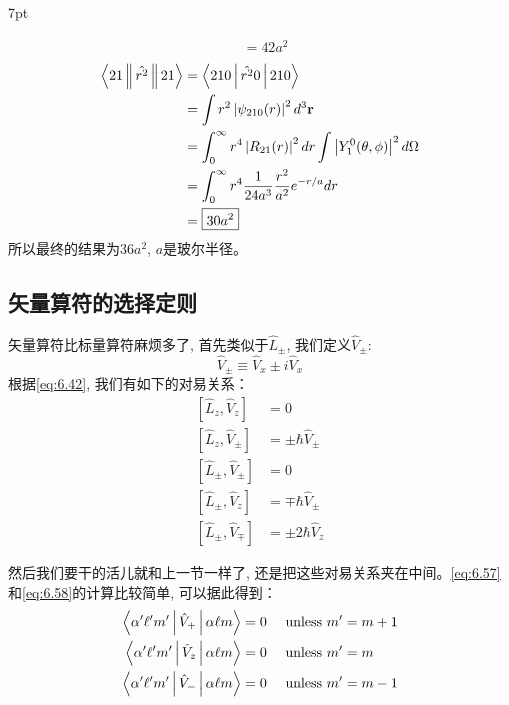 \documentclass[a4paper,zihao=-4,linespread=1]{ctexrep}
\newenvironment{thinknote}{%
\def\FrameCommand{%
\hspace{1pt}%
{\color{BurlyWood}\vrule width 2pt}%
{\color{formalshade}\vrule width 4pt}%
\colorbox{formalshade}%
}%
\MakeFramed{\advance\hsize-\width\FrameRestore}%
\noindent\hspace{-4.55pt}%
\begin{adjustwidth}{}{7pt}%
\vspace{2pt}\vspace{2pt}%
}
{%
\vspace{2pt}\end{adjustwidth}\endMakeFramed%
}
\begin{document}
\begin{thinknote}
\begin{align*}
            &=\boxed{42 a^{2} }
        \end{align*}
        \begin{align*}
            \Braket{21\|\hat{r^2}\|21}&=\Braket{210|\hat{r^2}0|210}\\
            &=\int r^{2}\left|\psi_{210}(r)\right|^{2} d^{3} \mathbf{r} \\
            &=\int_{0}^{\infty} r^{4}\left|R_{21}(r)\right|^{2} d r \int\left|Y_{1}^{0}(\theta, \phi)\right|^{2} d \Omega\\
            &=\int_{0}^{\infty} r^{4} \frac{1}{24 a^{3}} \frac{r^{2}}{a^{2}} e^{-r / a} d r\\
            &=\boxed{30 a^{2}}
        \end{align*}
        所以最终的结果为$36a^2$, $a$是玻尔半径。
    \end{thinknote}

    \subsection{矢量算符的选择定则}
    矢量算符比标量算符麻烦多了, 首先类似于$\hat L_\pm$, 我们定义$\hat V_\pm$:
    \begin{equation}
        \hat V_\pm\equiv\hat{V}_x\pm i \hat{V}_x
    \end{equation}
    根据\ref{eq:6.42}, 我们有如下的对易关系：
    \begin{align}
        {\left[\hat{L}_{z}, \hat{V}_{z}\right] } &=0 \label{eq:6.57}\\
        {\left[\hat{L}_{z}, \hat{V}_{\pm}\right] } &=\pm \hbar \hat{V}_{\pm} \label{eq:6.58} \\
        {\left[\hat{L}_{\pm}, \hat{V}_{\pm}\right] } &=0 \label{eq:6.59} \\
        {\left[\hat{L}_{\pm}, \hat{V}_{z}\right] } &=\mp \hbar \hat{V}_{\pm} \label{eq:6.60} \\
        {\left[\hat{L}_{\pm}, \hat{V}_{\mp}\right] } &=\pm 2 \hbar \hat{V}_{z} \label{eq:6.61}
    \end{align}

    然后我们要干的活儿就和上一节一样了, 还是把这些对易关系夹在中间。\ref{eq:6.57}和\ref{eq:6.58}的计算比较简单, 可以据此得到：
    \begin{align}
        \Braket{\alpha^{\prime} \ell^{\prime} m^{\prime}|\hat{V}_{+}| \alpha \ell m}  & = 0 \quad \text { unless } m^{\prime}  = m+1\label{eq:6.63}\\
        \Braket{\alpha^{\prime} \ell^{\prime} m^{\prime}|\hat{V}_{z}| \alpha \ell m}  & = 0 \quad \text { unless } m^{\prime}  = m\label{eq:6.64}\\
        \Braket{\alpha^{\prime} \ell^{\prime} m^{\prime}|\hat{V}_{-}| \alpha \ell m}  & = 0 \quad \text { unless } m^{\prime}  = m-1 \label{eq:6.65}
    \end{align}
    
\end{document}
